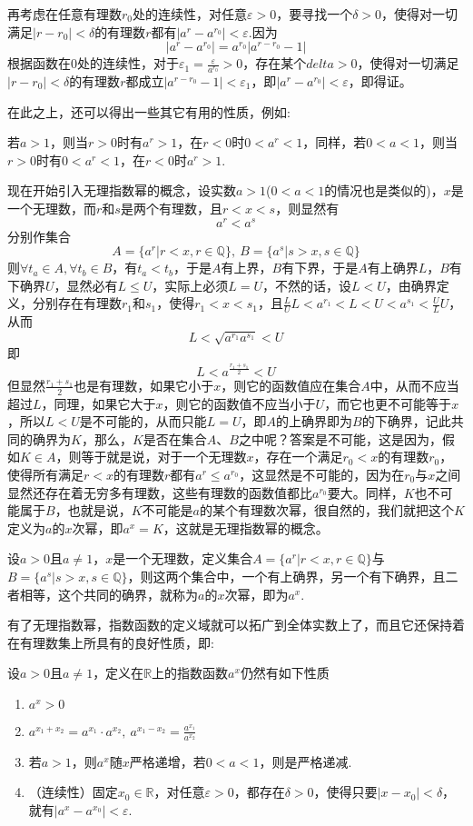 再考虑在任意有理数$r_0$处的连续性，对任意$\varepsilon>0$，要寻找一个$\delta>0$，使得对一切满足$|r-r_0|<\delta$的有理数$r$都有$|a^r-a^{r_0}|<\varepsilon$.因为
\[ |a^r-a^{r_0}| = a^{r_0} |a^{r-r_0}-1| \]
根据函数在0处的连续性，对于$\varepsilon_1 = \frac{\varepsilon}{a^{r_0}}>0$，存在某个$delta>0$，使得对一切满足$|r-r_0|<\delta$的有理数$r$都成立$|a^{r-r_0}-1|<\varepsilon_1$，即$|a^r-a^{r_0}|<\varepsilon$，即得证。

在此之上，还可以得出一些其它有用的性质，例如:
\begin{inference}
  若$a>1$，则当$r>0$时有$a^r>1$，在$r<0$时$0<a^r<1$，同样，若$0<a<1$，则当$r>0$时有$0<a^r<1$，在$r<0$时$a^r>1$.
\end{inference}

现在开始引入无理指数幂的概念，设实数$a>1$($0<a<1$的情况也是类似的)，$x$是一个无理数，而$r$和$s$是两个有理数，且$r<x<s$，则显然有
\[ a^r<a^s \]
分别作集合
\[ A = \{ a^r | r<x,r \in \mathbb{Q} \}, \  B = \{ a^s | s>x,s \in \mathbb{Q} \} \]
则$\forall t_a \in A, \forall t_b \in B$，有$t_a<t_b$，于是$A$有上界，$B$有下界，于是$A$有上确界$L$，$B$有下确界$U$，显然必有$L\leqslant U$，实际上必须$L=U$，不然的话，设$L<U$，由确界定义，分别存在有理数$r_1$和$s_1$，使得$r_1<x<s_1$，且$\frac{L}{U}L<a^{r_1}<L<U<a^{s_1}<\frac{U}{L}U$，从而
\[ L<\sqrt{a^{r_1}a^{s_1}}<U \]
即
\[ L<a^{\frac{r_1+s_1}{2}}<U \]
但显然$\frac{r_1+s_1}{2}$也是有理数，如果它小于$x$，则它的函数值应在集合$A$中，从而不应当超过$L$，同理，如果它大于$x$，则它的函数值不应当小于$U$，而它也更不可能等于$x$，所以$L<U$是不可能的，从而只能$L=U$，即$A$的上确界即为$B$的下确界，记此共同的确界为$K$，那么，$K$是否在集合$A$、$B$之中呢？答案是不可能，这是因为，假如$K \in A$，则等于就是说，对于一个无理数$x$，存在一个满足$r_0<x$的有理数$r_0$，使得所有满足$r<x$的有理数$r$都有$a^r \leqslant a^{r_0}$，这显然是不可能的，因为在$r_0$与$x$之间显然还存在着无穷多有理数，这些有理数的函数值都比$a^{r_0}$要大。同样，$K$也不可能属于$B$，也就是说，$K$不可能是$a$的某个有理数次幂，很自然的，我们就把这个$K$定义为$a$的$x$次幂，即$a^x=K$，这就是无理指数幂的概念。

\begin{definition}
  设$a>0$且$a \neq 1$，$x$是一个无理数，定义集合$A=\{a^r|r<x,r \in \mathbb{Q} \}$与$B=\{a^s|s>x,s \in \mathbb{Q}\}$，则这两个集合中，一个有上确界，另一个有下确界，且二者相等，这个共同的确界，就称为$a$的$x$次幂，即为$a^x$.
\end{definition}

有了无理指数幂，指数函数的定义域就可以拓广到全体实数上了，而且它还保持着在有理数集上所具有的良好性质，即:
\begin{theorem}
  设$a>0$且$a \neq 1$，定义在$\mathbb{R}$上的指数函数$a^x$仍然有如下性质
\begin{enumerate}
\item $a^x>0$
\item $a^{x_1+x_2}=a^{x_1}\cdot a^{x_2}, \ a^{x_1-x_2} = \frac{a^{x_1}}{a^{x_2}} $
\item 若$a>1$，则$a^x$随$x$严格递增，若$0<a<1$，则是严格递减.
\item （连续性）固定$x_0\in \mathbb{R}$，对任意$\varepsilon>0$，都存在$\delta>0$，使得只要$|x-x_0|<\delta$，就有$|a^x-a^{x_0}|<\varepsilon$.
\end{enumerate}
\end{theorem}

